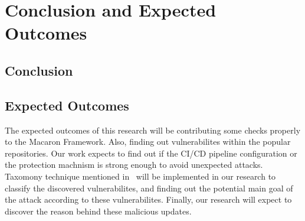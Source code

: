 \section{Conclusion and Expected Outcomes}
\subsection{Conclusion}

\subsection{Expected Outcomes}
The expected outcomes of this research will be contributing some checks properly to the Macaron 
Framework. Also, finding out vulnerabilites within the popular repositories. Our work expects to 
find out if the CI/CD pipeline configuration or the protection machnism is strong enough to 
avoid unexpected attacks. Taxomony technique mentioned in~\cite{ohm2020backstabber} will be 
implemented in our research to classify the discovered vulnerabilites, and finding out the potential
main goal of the attack according to these vulnerabilites. Finally, our research will expect to 
discover the reason behind these malicious updates.   